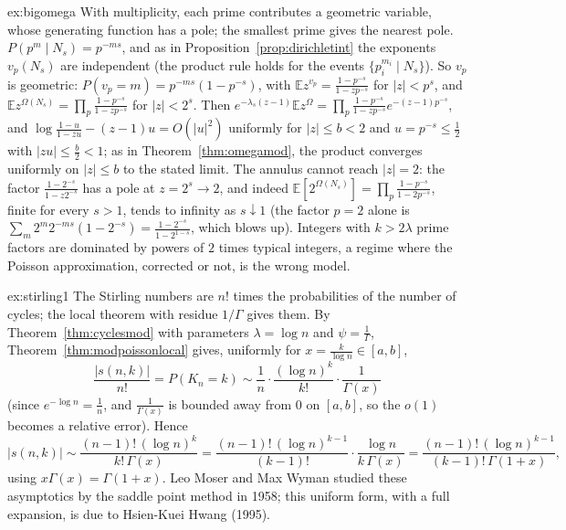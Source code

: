 \begin{solution}{ex:bigomega}
\idea With multiplicity, each prime contributes a geometric variable, whose generating function has a pole; the smallest prime gives the nearest pole.
\writeup $P(p^m\mid N_s)=p^{-ms}$, and as in Proposition~\ref{prop:dirichletint} the exponents $v_p(N_s)$ are independent (the product rule holds for the events $\{p_i^{m_i}\mid N_s\}$). So $v_p$ is geometric: $P(v_p=m)=p^{-ms}(1-p^{-s})$, with
$\mathbb Ez^{v_p}=\frac{1-p^{-s}}{1-zp^{-s}}$ for $|z|<p^s$, and $\mathbb Ez^{\Omega(N_s)}=\prod_p\frac{1-p^{-s}}{1-zp^{-s}}$ for $|z|<2^s$. Then $e^{-\lambda_s(z-1)}\mathbb Ez^{\Omega}=\prod_p\frac{1-p^{-s}}{1-zp^{-s}}e^{-(z-1)p^{-s}}$, and
$\log\frac{1-u}{1-zu}-(z-1)u=O(|u|^2)$ uniformly for $|z|\le b<2$ and $u=p^{-s}\le\frac12$ with $|zu|\le\frac b2<1$; as in Theorem~\ref{thm:omegamod}, the product converges uniformly on $|z|\le b$ to the stated limit. The annulus cannot reach $|z|=2$: the factor
$\frac{1-2^{-s}}{1-z2^{-s}}$ has a pole at $z=2^s\to2$, and indeed $\mathbb E[2^{\Omega(N_s)}]=\prod_p\frac{1-p^{-s}}{1-2p^{-s}}$, finite for every $s>1$, tends to infinity as $s\downarrow1$ (the factor $p=2$ alone is $\sum_m2^m2^{-ms}(1-2^{-s})=\frac{1-2^{-s}}{1-2^{1-s}}$, which blows up). Integers with $k>2\lambda$ prime
factors are dominated by powers of $2$ times typical integers, a regime where the Poisson approximation, corrected or not, is the wrong model.
\end{solution}

\begin{solution}{ex:stirling1}
\idea The Stirling numbers are $n!$ times the probabilities of the number of cycles; the local theorem with residue $1/\Gamma$ gives them.
\writeup By Theorem~\ref{thm:cyclesmod} with parameters $\lambda=\log n$ and $\psi=\frac1\Gamma$, Theorem~\ref{thm:modpoissonlocal} gives, uniformly for $x=\frac k{\log n}\in[a,b]$,
\[
\frac{|s(n,k)|}{n!}=P(K_n=k)\sim\frac1n\cdot\frac{(\log n)^k}{k!}\cdot\frac1{\Gamma(x)}
\]
(since $e^{-\log n}=\frac1n$, and $\frac1{\Gamma(x)}$ is bounded away from $0$ on $[a,b]$, so the $o(1)$ becomes a relative error). Hence
\[
|s(n,k)|\sim\frac{(n-1)!\,(\log n)^k}{k!\,\Gamma(x)}=\frac{(n-1)!\,(\log n)^{k-1}}{(k-1)!}\cdot\frac{\log n}{k\,\Gamma(x)}=\frac{(n-1)!\,(\log n)^{k-1}}{(k-1)!\,\Gamma(1+x)},
\]
using $x\Gamma(x)=\Gamma(1+x)$. Leo Moser and Max Wyman studied these asymptotics by the saddle point method in 1958; this uniform form, with a full expansion, is due to Hsien-Kuei Hwang (1995).
\end{solution}

